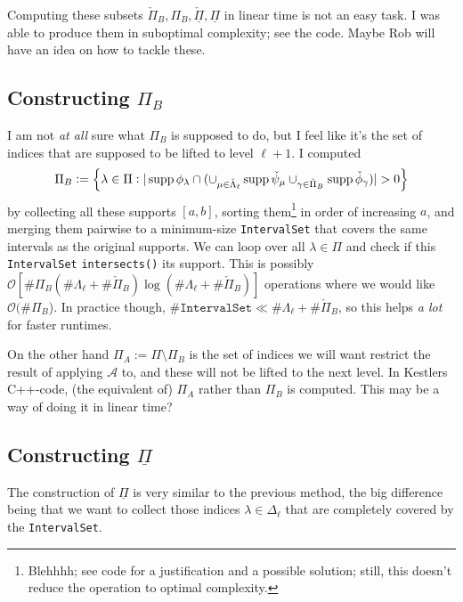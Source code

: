 \documentclass[11pt,a4paper]{amsart}
\theoremstyle{definition}
\DeclareMathOperator{\supp}{supp}
\begin{document}
Computing these subsets $\check \Pi_B, \Pi_B, \underline{\check \Pi}, \underline \Pi$
in linear time is not an easy task. I was able to produce them in suboptimal complexity;
see the code. Maybe Rob will have an idea on how to tackle these.

\subsection{Constructing $\Pi_B$}
I am not \emph{at all} sure what $\Pi_B$ is supposed to do, but I feel like it's
the set of indices that are supposed to be lifted to level $\ell+1$. I computed 
\[
  \Pi_B := \set{\lambda \in \Pi: |\supp \phi_\lambda \cap
      (\cup_{\mu \in \check \Lambda_\ell} \supp \check \psi_\mu
       \cup_{\gamma \in \check \Pi_B} \supp \check \phi_\gamma)| > 0}
\]
by collecting all these supports $[a,b]$, sorting them\footnote{Blehhhh; see code
for a justification and a possible solution; still, this doesn't reduce the
operation to optimal complexity.} in order of increasing $a$, and merging them
pairwise to a minimum-size \texttt{IntervalSet} that covers the same intervals
as the original supports. We can loop over all $\lambda \in \Pi$ and check if
this \texttt{IntervalSet} \texttt{intersects()} its support. This is possibly
$\mathcal O[\# \Pi_B (\# \Lambda_\ell + \# \check \Pi_B) \log(\# \Lambda_\ell + \# \check \Pi_B)]$
operations where we would like $\mathcal O(\# \Pi_B$).  In practice though,
$\#\mathtt{IntervalSet} \ll \# \Lambda_\ell + \# \check \Pi_B$, so this helps
\emph{a lot} for faster runtimes.

On the other
hand $\Pi_A := \Pi \setminus \Pi_B$ is the set of indices we will want restrict
the result of applying $\mathcal A$ to, and these will not be lifted to the next
level. In Kestlers C++-code, (the equivalent of) $\Pi_A$ rather than $\Pi_B$ is
computed. This may be a way of doing it in linear time?

\subsection{Constructing $\underline \Pi$}
The construction of $\underline \Pi$ is very similar to the previous method, the
big difference being that we want to collect those indices $\lambda \in \Delta_\ell$
that are completely covered by the \texttt{IntervalSet}.
\end{document}
